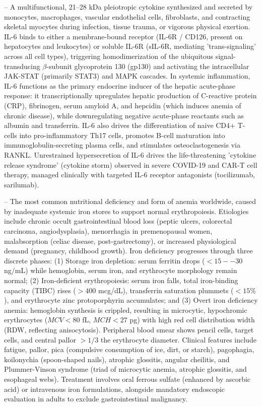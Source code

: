 -- A multifunctional, 21--28 kDa pleiotropic cytokine synthesized and secreted by monocytes, macrophages, vascular endothelial cells, fibroblasts, and contracting skeletal myocytes during infection, tissue trauma, or vigorous physical exertion. IL-6 binds to either a membrane-bound receptor (IL-6R / CD126, present on hepatocytes and leukocytes) or soluble IL-6R (sIL-6R, mediating 'trans-signaling' across all cell types), triggering homodimerization of the ubiquitous signal-transducing $\beta$-subunit glycoprotein 130 (gp130) and activating the intracellular JAK-STAT (primarily STAT3) and MAPK cascades. In systemic inflammation, IL-6 functions as the primary endocrine inducer of the hepatic acute-phase response: it transcriptionally upregulates hepatic production of C-reactive protein (CRP), fibrinogen, serum amyloid A, and hepcidin (which induces anemia of chronic disease), while downregulating negative acute-phase reactants such as albumin and transferrin. IL-6 also drives the differentiation of naive CD4+ T-cells into pro-inflammatory Th17 cells, promotes B-cell maturation into immunoglobulin-secreting plasma cells, and stimulates osteoclastogenesis via RANKL. Unrestrained hypersecretion of IL-6 drives the life-threatening 'cytokine release syndrome' (cytokine storm) observed in severe COVID-19 and CAR-T cell therapy, managed clinically with targeted IL-6 receptor antagonists (tocilizumab, sarilumab).

-- The most common nutritional deficiency and form of anemia worldwide, caused by inadequate systemic iron stores to support normal erythropoiesis. Etiologies include chronic occult gastrointestinal blood loss (peptic ulcers, colorectal carcinoma, angiodysplasia), menorrhagia in premenopausal women, malabsorption (celiac disease, post-gastrectomy), or increased physiological demand (pregnancy, childhood growth). Iron deficiency progresses through three discrete phases: (1) Storage iron depletion: serum ferritin drops ($<15--30$ ng/mL) while hemoglobin, serum iron, and erythrocyte morphology remain normal; (2) Iron-deficient erythropoiesis: serum iron falls, total iron-binding capacity (TIBC) rises ($>400$ mcg/dL), transferrin saturation plummets ($<15\%$), and erythrocyte zinc protoporphyrin accumulates; and (3) Overt iron deficiency anemia: hemoglobin synthesis is crippled, resulting in microcytic, hypochromic erythrocytes ($MCV < 80$ fL, $MCH < 27$ pg) with high red cell distribution width (RDW, reflecting anisocytosis). Peripheral blood smear shows pencil cells, target cells, and central pallor $>1/3$ the erythrocyte diameter. Clinical features include fatigue, pallor, pica (compulsive consumption of ice, dirt, or starch), pagophagia, koilonychia (spoon-shaped nails), atrophic glossitis, angular cheilitis, and Plummer-Vinson syndrome (triad of microcytic anemia, atrophic glossitis, and esophageal webs). Treatment involves oral ferrous sulfate (enhanced by ascorbic acid) or intravenous iron formulations, alongside mandatory endoscopic evaluation in adults to exclude gastrointestinal malignancy.


